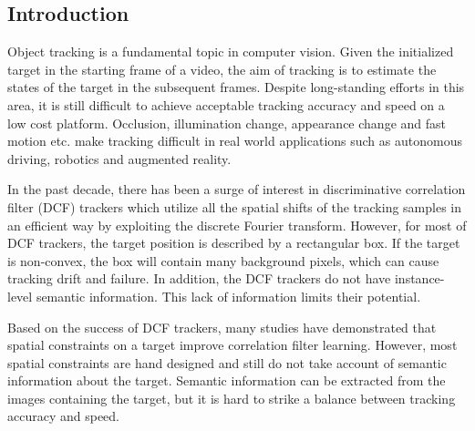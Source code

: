 \documentclass[review]{elsarticle}
\begin{document}
\begin{CJK*}{UTF8}{gbsn}

\section{Introduction}
Object tracking is a fundamental topic in computer vision. Given the initialized target in the starting frame of a video, the aim of tracking is to estimate the states of the target in the subsequent frames. Despite long-standing efforts \cite{Bolme2010VisualOT, Danelljan2014AccurateSE, Henriques2015HighSpeedTW, Li2014ASA, Nam2016LearningMC, Danelljan2015ConvolutionalFF, Wang2018SiamMask} in this area, it is still difficult to achieve acceptable tracking accuracy and speed on a low cost platform. Occlusion, illumination change, appearance change and fast motion etc. make tracking difficult in real world applications such as autonomous driving, robotics and augmented reality.

In the past decade, there has been a surge of interest in discriminative correlation filter (DCF) trackers \cite{Bolme2010VisualOT, Danelljan2014AccurateSE, Henriques2015HighSpeedTW, Li2014ASA} which utilize all the spatial shifts of the tracking samples in an efficient way by exploiting the discrete Fourier transform. However, for most of DCF trackers, the target position is described by a rectangular box. If the target is non-convex, the box will contain many background pixels, which can cause tracking drift and failure. In addition, the DCF trackers do not have instance-level semantic information. This lack of information limits their potential.

Based on the success of DCF trackers, many studies \cite{Danelljan2015LearningSR, Lukezic2017DiscriminativeCF, Galoogahi2017LearningBC, Xu2018LearningAD, Feng2018LearningSR} have demonstrated that spatial constraints on a target improve correlation filter learning. However, most spatial constraints are hand designed and still do not take account of semantic information about the target. Semantic information can be extracted from the images containing the target, but it is hard to strike a balance between tracking accuracy and speed.


\end{CJK*}
\end{document}
